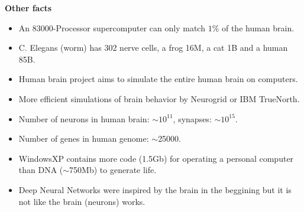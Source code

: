 \documentclass[main]{subfiles}
\begin{document}
\textbf{Other facts}
\begin{itemize}[noitemsep,nolistsep]
	\item An 83000-Processor supercomputer can only match $1\%$ of the human brain.
	\item C. Elegans (worm) has 302 nerve cells, a frog 16M, a cat 1B and a human 85B.
	\item Human brain project aims to simulate the entire human brain on computers.
	\item More efficient simulations of brain behavior by Neurogrid or IBM TrueNorth.
	\item Number of neurons in human brain: $\sim10^{11}$, synapses: $\sim10^{15}$.
	\item Number of genes in human genome: $\sim$25000.
	\item WindowsXP contains more code (1.5Gb) for operating a personal computer than DNA ($\sim$750Mb) to generate life.
	\item Deep Neural Networks were inspired by the brain in the beggining but it is not like the brain (neurons) works.
	
\end{itemize}
\end{document}
